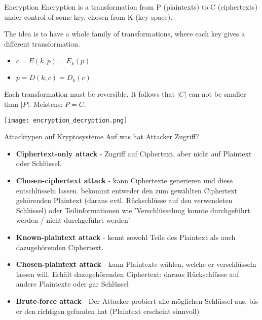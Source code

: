\begin{minipage}{0.65\linewidth}
\begin{theorem}{Encryption}
    Encryption is a transformation from P (plaintexts) to C (ciphertexts) under control of some key, chosen from K (key space).
    
    The idea is to have a whole family of transformations, where each key gives a different transformation.
    \begin{itemize}
        \item $c = E(k, p) = E_k(p)$
        \item $p = D(k, c) = D_k(c)$
    \end{itemize}
    
    Each transformation must be reversible. It follows that $|C|$ can not be smaller than $|P|$. Meistens: $P = C$.
\end{theorem}
\end{minipage}
\begin{minipage}{0.35\linewidth}
\texttt{[image: encryption\_decryption.png]}
\end{minipage}


\begin{KR}{Attacktypen auf Kryptosysteme} Auf was hat Attacker Zugriff?
    \begin{itemize}
        \item \textbf{Ciphertext-only attack} - Zugriff auf Ciphertext, aber nicht auf Plaintext oder Schlüssel.
        \item \textbf{Chosen-ciphertext attack} - kann Ciphertexte generieren und diese entschlüsseln lassen.
        bekommt entweder den zum gewählten Ciphertext gehörenden Plaintext (daraus evtl. Rückschlüsse auf den verwendeten Schlüssel) 
        oder Teilinformationen wie 'Verschlüsselung konnte durchgeführt werden / nicht durchgeführt werden'
        \item \textbf{Known-plaintext attack} - kennt sowohl Teile des Plaintext als auch dazugehörenden Ciphertext.
        \item \textbf{Chosen-plaintext attack} - kann Plaintexte wählen, welche er verschlüsseln lassen will. 
        Erhält dazugehörenden Ciphertext: daraus Rückschlüsse auf andere Plaintexte oder gar Schlüssel 
        \item \textbf{Brute-force attack} - Der Attacker probiert alle möglichen Schlüssel aus, bis er den richtigen gefunden hat (Plaintext erscheint sinnvoll)
    \end{itemize}
\end{KR}

